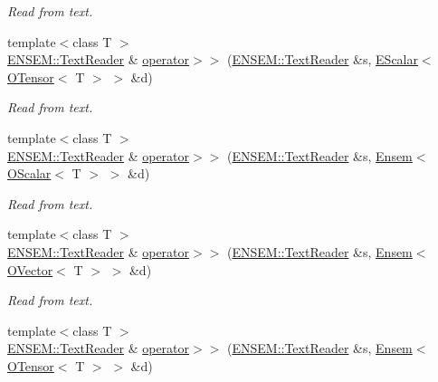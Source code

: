 \begin{DoxyCompactItemize}
\begin{DoxyCompactList}\small\item\em Read from text. \end{DoxyCompactList}\item 
{\footnotesize template$<$class T $>$ }\\\mbox{\hyperlink{classENSEM_1_1TextReader}{E\+N\+S\+E\+M\+::\+Text\+Reader}} \& \mbox{\hyperlink{namespaceENSEM_a09c1f3286f4513b7ecefb96943278df6}{operator$>$$>$}} (\mbox{\hyperlink{classENSEM_1_1TextReader}{E\+N\+S\+E\+M\+::\+Text\+Reader}} \&s, \mbox{\hyperlink{classENSEM_1_1EScalar}{E\+Scalar}}$<$ \mbox{\hyperlink{classENSEM_1_1OTensor}{O\+Tensor}}$<$ T $>$ $>$ \&d)
\begin{DoxyCompactList}\small\item\em Read from text. \end{DoxyCompactList}\item 
{\footnotesize template$<$class T $>$ }\\\mbox{\hyperlink{classENSEM_1_1TextReader}{E\+N\+S\+E\+M\+::\+Text\+Reader}} \& \mbox{\hyperlink{namespaceENSEM_a5d4f982512e5f2e704e9f359ce2bf383}{operator$>$$>$}} (\mbox{\hyperlink{classENSEM_1_1TextReader}{E\+N\+S\+E\+M\+::\+Text\+Reader}} \&s, \mbox{\hyperlink{classENSEM_1_1Ensem}{Ensem}}$<$ \mbox{\hyperlink{classENSEM_1_1OScalar}{O\+Scalar}}$<$ T $>$ $>$ \&d)
\begin{DoxyCompactList}\small\item\em Read from text. \end{DoxyCompactList}\item 
{\footnotesize template$<$class T $>$ }\\\mbox{\hyperlink{classENSEM_1_1TextReader}{E\+N\+S\+E\+M\+::\+Text\+Reader}} \& \mbox{\hyperlink{namespaceENSEM_a0c98998b29525fa9334da078ac37fe70}{operator$>$$>$}} (\mbox{\hyperlink{classENSEM_1_1TextReader}{E\+N\+S\+E\+M\+::\+Text\+Reader}} \&s, \mbox{\hyperlink{classENSEM_1_1Ensem}{Ensem}}$<$ \mbox{\hyperlink{classENSEM_1_1OVector}{O\+Vector}}$<$ T $>$ $>$ \&d)
\begin{DoxyCompactList}\small\item\em Read from text. \end{DoxyCompactList}\item 
{\footnotesize template$<$class T $>$ }\\\mbox{\hyperlink{classENSEM_1_1TextReader}{E\+N\+S\+E\+M\+::\+Text\+Reader}} \& \mbox{\hyperlink{namespaceENSEM_a0fb9e35cf8c1d41d42dd10cefcf7cbe5}{operator$>$$>$}} (\mbox{\hyperlink{classENSEM_1_1TextReader}{E\+N\+S\+E\+M\+::\+Text\+Reader}} \&s, \mbox{\hyperlink{classENSEM_1_1Ensem}{Ensem}}$<$ \mbox{\hyperlink{classENSEM_1_1OTensor}{O\+Tensor}}$<$ T $>$ $>$ \&d)

\end{DoxyCompactItemize}
